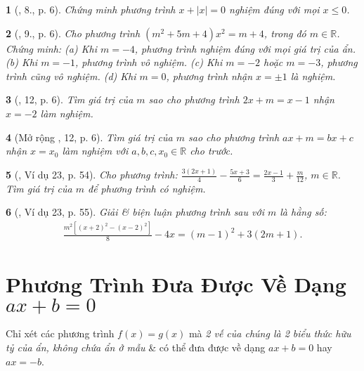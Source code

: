 \documentclass{article}
\newtheorem{baitoan}{}
\begin{document}
\begin{baitoan}[\cite{SBT_Toan_8_tap_2}, 8., p. 6]
	Chứng minh phương trình $x + |x| = 0$ nghiệm đúng với mọi $x\le0$.
\end{baitoan}

\begin{baitoan}[\cite{SBT_Toan_8_tap_2}, 9., p. 6]
	Cho phương trình $(m^2 + 5m + 4)x^2 = m + 4$, trong đó $m\in\mathbb{R}$. Chứng minh: (a) Khi $m = -4$, phương trình nghiệm đúng với mọi giá trị của ẩn. (b) Khi $m = -1$, phương trình vô nghiệm. (c) Khi $m = -2$ hoặc $m = -3$, phương trình cũng vô nghiệm. (d) Khi $m = 0$, phương trình nhận $x = \pm1$ là nghiệm.
\end{baitoan}

\begin{baitoan}[\cite{SBT_Toan_8_tap_2}, 12, p. 6]
	Tìm giá trị của $m$ sao cho phương trình $2x + m = x - 1$ nhận $x = -2$ làm nghiệm.
\end{baitoan}

\begin{baitoan}[Mở rộng \cite{SBT_Toan_8_tap_2}, 12, p. 6]
	Tìm giá trị của $m$ sao cho phương trình $ax + m = bx + c$ nhận $x = x_0$ làm nghiệm với $a,b,c,x_0\in\mathbb{R}$ cho trước.
\end{baitoan}

\begin{baitoan}[\cite{Tuyen_Toan_8}, Ví dụ 23, p. 54]
	Cho phương trình: $\frac{3(2x + 1)}{4} - \frac{5x + 3}{6} = \frac{2x - 1}{3} + \frac{m}{12}$, $m\in\mathbb{R}$. Tìm giá trị của $m$ để phương trình có nghiệm.
\end{baitoan}

\begin{baitoan}[\cite{Tuyen_Toan_8}, Ví dụ 23, p. 55]
	Giải \& biện luận phương trình sau với $m$ là hằng số:
	\begin{align*}
		\frac{m^2[(x + 2)^2 - (x - 2)^2]}{8} - 4x = (m - 1)^2 + 3(2m + 1).
	\end{align*}
\end{baitoan}


\section{Phương Trình Đưa Được Về Dạng $ax + b = 0$}
Chỉ xét các phương trình $f(x) = g(x)$ mà \textit{2 vế của chúng là 2 biểu thức hữu tỷ của ẩn, không chứa ẩn ở mẫu} \& có thể đưa được về dạng $ax + b = 0$ hay $ax = -b$.
\end{document}
